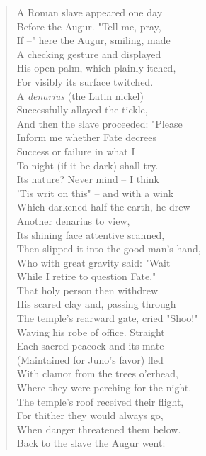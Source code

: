 \documentclass[11pt]{article}
\begin{document}
\begin{quote}   A Roman slave appeared one day \\
  Before the Augur.  "Tell me, pray, \\
  If --" here the Augur, smiling, made \\
  A checking gesture and displayed \\
  His open palm, which plainly itched, \\
  For visibly its surface twitched. \\
  A {\em denarius} (the Latin nickel) \\
  Successfully allayed the tickle, \\
  And then the slave proceeded:  "Please \\
  Inform me whether Fate decrees \\
  Success or failure in what I \\
  To-night (if it be dark) shall try. \\
  Its nature?  Never mind -- I think \\
  'Tis writ on this" -- and with a wink \\
  Which darkened half the earth, he drew \\
  Another denarius to view, \\
  Its shining face attentive scanned, \\
  Then slipped it into the good man's hand, \\
  Who with great gravity said:  "Wait \\
  While I retire to question Fate." \\
  That holy person then withdrew \\
  His scared clay and, passing through \\
  The temple's rearward gate, cried "Shoo!" \\
  Waving his robe of office.  Straight \\
  Each sacred peacock and its mate \\
  (Maintained for Juno's favor) fled \\
  With clamor from the trees o'erhead, \\
  Where they were perching for the night. \\
  The temple's roof received their flight, \\
  For thither they would always go, \\
  When danger threatened them below. \\
  Back to the slave the Augur went: \\

\end{quote}
\end{document}
